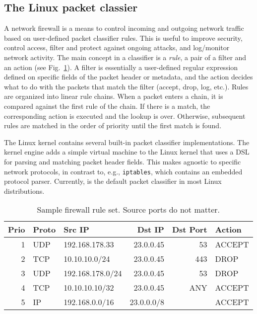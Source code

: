 \subsection{The Linux packet classier}
\label{sec:sa-pack-class}

A network firewall is a means to control incoming and outgoing network traffic based on user-defined packet classifier rules. This is useful to improve security, control access, filter and protect against ongoing attacks, and log\slash monitor network activity. The main concept in a classifier is a \emph{rule}, a pair of a filter and an action (see Fig.~\ref{fig:class-sample}). A filter is essentially a user-defined regular expression defined on specific fields of the packet header or metadata, and the action decides what to do with the packets that match the filter (accept, drop, log, etc.). Rules are organized into linear rule chains. When a packet enters a chain, it is compared against the first rule of the chain. If there is a match, the corresponding action is executed and the lookup is over. Otherwise, subsequent rules are matched in the order of priority until the first match is found.

The Linux kernel contains several built-in packet classifier implementations. The \nftables kernel engine adds a simple virtual machine to the Linux kernel that uses a DSL for parsing and matching packet header fields. This makes \nftables agnostic to specific network protocols, in contrast to, e.g., \texttt{iptables}, which contains an embedded protocol parser. Currently, \nftables is the default packet classifier in most Linux distributions.

\begin{table}[t]
  \centering
  \caption{Sample firewall rule set. Source ports do not matter.}
  \label{fig:class-sample}
  \begin{small}
    \renewcommand{\tabcolsep}{2pt}
    \begin{tabular}{r|l|l|r|r|l}
      \textbf{Prio} & \textbf{Proto} & \textbf{Src IP} & \textbf{Dst IP} & \textbf{Dst Port} & \textbf{Action}\\
      \hline
      1 & UDP & 192.168.178.33   & 23.0.0.45  & 53  & ACCEPT\\
      2 & TCP & 10.10.10.0/24    & 23.0.0.45  & 443 & DROP\\
      3 & UDP & 192.168.178.0/24 & 23.0.0.45  & 53  & DROP\\
      4 & TCP & 10.10.10.10/32   & 23.0.0.45  & ANY & ACCEPT\\
      5 & IP  & 192.168.0.0/16   & 23.0.0.0/8 &     & ACCEPT\\
    \end{tabular}
  \end{small}%
\end{table}

